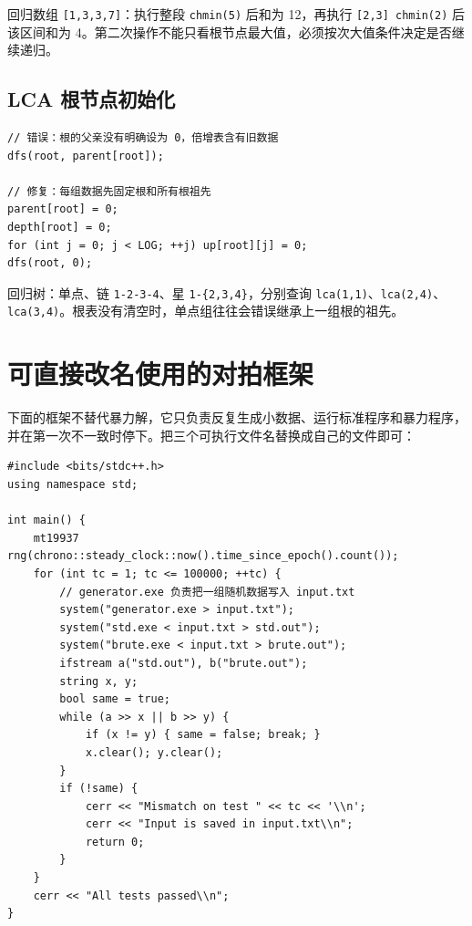 \documentclass[UTF8,openany,oneside,zihao=-4]{ctexbook}
\begin{document}
回归数组 \lstinline|[1,3,3,7]|：执行整段 \lstinline|chmin(5)| 后和为 12，再执行 \lstinline|[2,3] chmin(2)| 后该区间和为 4。第二次操作不能只看根节点最大值，必须按次大值条件决定是否继续递归。

\subsection{LCA 根节点初始化}

\begin{lstlisting}
// 错误：根的父亲没有明确设为 0，倍增表含有旧数据
dfs(root, parent[root]);

// 修复：每组数据先固定根和所有根祖先
parent[root] = 0;
depth[root] = 0;
for (int j = 0; j < LOG; ++j) up[root][j] = 0;
dfs(root, 0);
\end{lstlisting}

回归树：单点、链 \lstinline|1-2-3-4|、星 \lstinline|1-{2,3,4}|，分别查询 \lstinline|lca(1,1)|、\lstinline|lca(2,4)|、\lstinline|lca(3,4)|。根表没有清空时，单点组往往会错误继承上一组根的祖先。

\section{可直接改名使用的对拍框架}

下面的框架不替代暴力解，它只负责反复生成小数据、运行标准程序和暴力程序，并在第一次不一致时停下。把三个可执行文件名替换成自己的文件即可：

\begin{lstlisting}
#include <bits/stdc++.h>
using namespace std;

int main() {
    mt19937 rng(chrono::steady_clock::now().time_since_epoch().count());
    for (int tc = 1; tc <= 100000; ++tc) {
        // generator.exe 负责把一组随机数据写入 input.txt
        system("generator.exe > input.txt");
        system("std.exe < input.txt > std.out");
        system("brute.exe < input.txt > brute.out");
        ifstream a("std.out"), b("brute.out");
        string x, y;
        bool same = true;
        while (a >> x || b >> y) {
            if (x != y) { same = false; break; }
            x.clear(); y.clear();
        }
        if (!same) {
            cerr << "Mismatch on test " << tc << '\\n';
            cerr << "Input is saved in input.txt\\n";
            return 0;
        }
    }
    cerr << "All tests passed\\n";
}
\end{lstlisting}
\end{document}
